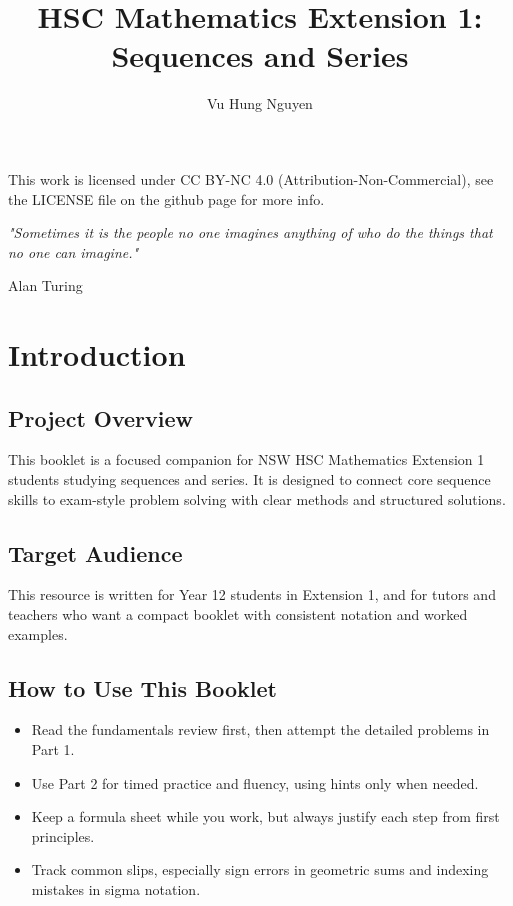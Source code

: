 \documentclass[12pt]{article}
\author{Vu Hung Nguyen}
\title{HSC Mathematics Extension 1: Sequences and Series}
\date{}
\theoremstyle{definition}
\begin{document}


\newpage


\begingroup\small\noindent This work is licensed under CC BY-NC 4.0 (Attribution-Non-Commercial), see the LICENSE file on the github page for more info.\par\endgroup

\newpage
\thispagestyle{empty}
\vspace*{\fill}
\begin{center}
\itshape
"Sometimes it is the people no one imagines anything of who do the things that no one can imagine."

\vspace{1em}
\normalfont Alan Turing
\end{center}
\vspace*{\fill}

\newpage
\tableofcontents
\newpage

\section{Introduction}

\subsection{Project Overview}
This booklet is a focused companion for NSW HSC Mathematics Extension 1 students studying sequences and series. It is designed to connect core sequence skills to exam-style problem solving with clear methods and structured solutions.

\subsection{Target Audience}
This resource is written for Year 12 students in Extension 1, and for tutors and teachers who want a compact booklet with consistent notation and worked examples.

\subsection{How to Use This Booklet}
\begin{itemize}[leftmargin=*]
  \item Read the fundamentals review first, then attempt the detailed problems in Part 1.
  \item Use Part 2 for timed practice and fluency, using hints only when needed.
  \item Keep a formula sheet while you work, but always justify each step from first principles.
  \item Track common slips, especially sign errors in geometric sums and indexing mistakes in sigma notation.
\end{itemize}
\end{document}
